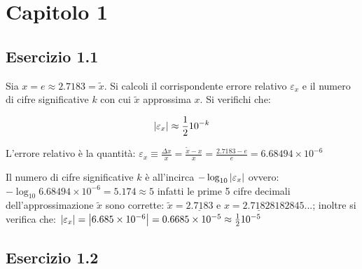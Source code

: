 \section{Capitolo 1}


	\subsection{Esercizio 1.1}
Sia $x = e \approx 2.7183 = \tilde{x}$. Si calcoli il corrispondente errore relativo $\varepsilon_x$ e il numero di cifre significative $k$ con cui $\tilde{x}$ approssima $x$. Si verifichi che:

\begin{equation}
	\abs{\varepsilon_x} \approx \frac{1}{2}10^{-k}
\end{equation}

L'errore relativo è la quantità: $\varepsilon_x \equiv \frac{\Delta{x}}{x}=\frac{\tilde{x}-x}{x} = \frac{2.7183-e}{e} = 6.68494 \times 10^{-6}$

Il numero di cifre significative $k$ è all'incirca $-\log_{10}{\abs{\varepsilon_x}}$ ovvero: $-\log_{10}{6.68494 \times 10^{-6}}=5.174 \approx 5$ infatti le prime 5 cifre decimali dell'approssimazione $\tilde{x}$ sono corrette: $\tilde{x}  =\underline{2.7183}$ e $x = \underline{2.71828}182845...$; inoltre si verifica che: $\abs{\varepsilon_x} = \abs{6.685 \times 10^{-6}} = 0.6685 \times 10^{-5} \approx \frac{1}{2}10^{-5}$


	\subsection{Esercizio 1.2}

